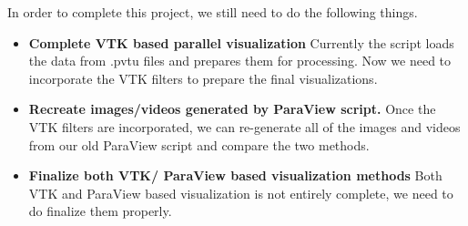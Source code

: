 In order to complete this project, we still need to do the following things.

\begin{itemize}
	\item \textbf{Complete VTK based parallel visualization} Currently the script loads the data from .pvtu files and prepares them for processing. Now we need to incorporate the VTK filters to prepare the final visualizations.
	\item \textbf{Recreate images/videos generated by ParaView script.} Once the VTK filters are incorporated, we can re-generate all of the images and videos from our old ParaView script and compare the two methods.
	\item \textbf{Finalize both VTK/ ParaView based visualization methods} Both VTK and ParaView based visualization is not entirely complete, we need to do finalize them properly. 
\end{itemize}